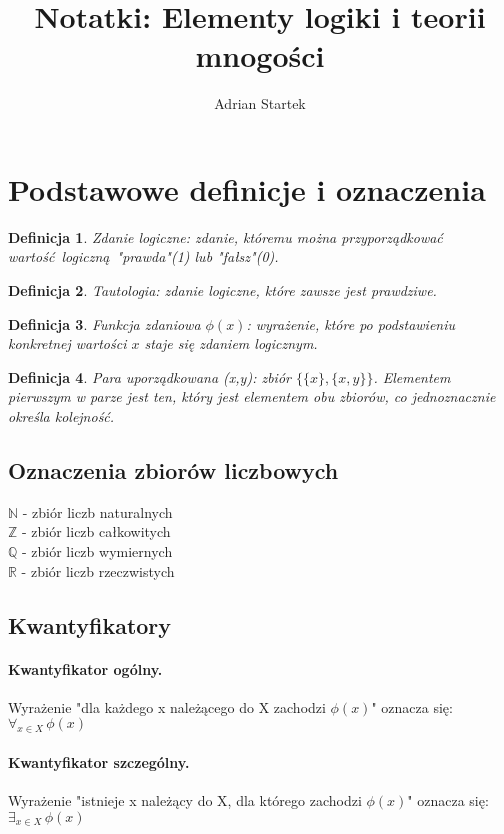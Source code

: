 \documentclass{article}
\title{Notatki: Elementy logiki i teorii mnogości}
\author{Adrian Startek}
\newtheorem{definition}{Definicja}[section]
\begin{document}
    \maketitle
    \newpage

    \section{Podstawowe definicje i oznaczenia}
    \begin{definition}
        Zdanie logiczne: zdanie, któremu można przyporządkować wartość logiczną "prawda"(1) lub "fałsz"(0).
    \end{definition}
    \begin{definition}
        Tautologia: zdanie logiczne, które zawsze jest prawdziwe.
    \end{definition}
    \begin{definition}
        Funkcja zdaniowa $\phi(x)$: wyrażenie, które po podstawieniu konkretnej wartości $x$ staje się zdaniem logicznym.
    \end{definition}
    \begin{definition}
        Para uporządkowana (x,y): zbiór $\{\{x\},\{x,y\}\}$. Elementem pierwszym w parze jest ten, który jest elementem obu zbiorów, co jednoznacznie określa kolejność.
    \end{definition}

    \subsection{Oznaczenia zbiorów liczbowych}
    $\mathbb{N}$ - zbiór liczb naturalnych\\
    $\mathbb{Z}$ - zbiór liczb całkowitych\\
    $\mathbb{Q}$ - zbiór liczb wymiernych\\
    $\mathbb{R}$ - zbiór liczb rzeczwistych

    \subsection{Kwantyfikatory}
    \paragraph{Kwantyfikator ogólny.} Wyrażenie "dla każdego x należącego do X zachodzi $\phi(x)$" oznacza się: $\forall_{x \in X} \, \phi(x)$
    \paragraph{Kwantyfikator szczególny.} Wyrażenie "istnieje x należący do X, dla którego zachodzi $\phi(x)$" oznacza się: $\exists_{x \in X} \, \phi(x)$
\end{document}

